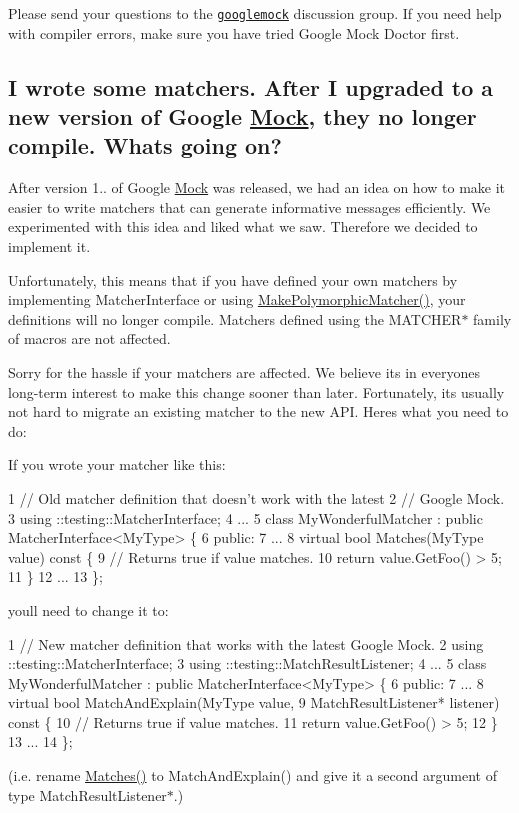 Please send your questions to the \href{http://groups.google.com/group/googlemock}{\tt googlemock} discussion group. If you need help with compiler errors, make sure you have tried Google Mock Doctor first.

\subsection*{I wrote some matchers. After I upgraded to a new version of Google \hyperlink{class_mock}{Mock}, they no longer compile. What\textquotesingle{}s going on?}

After version 1.. of Google \hyperlink{class_mock}{Mock} was released, we had an idea on how to make it easier to write matchers that can generate informative messages efficiently. We experimented with this idea and liked what we saw. Therefore we decided to implement it.

Unfortunately, this means that if you have defined your own matchers by implementing {\ttfamily Matcher\+Interface} or using {\ttfamily \hyperlink{namespacetesting_a667ca94f190ec2e17ee2fbfdb7d3da04}{Make\+Polymorphic\+Matcher()}}, your definitions will no longer compile. Matchers defined using the {\ttfamily M\+A\+T\+C\+H\+E\+R$\ast$} family of macros are not affected.

Sorry for the hassle if your matchers are affected. We believe it\textquotesingle{}s in everyone\textquotesingle{}s long-\/term interest to make this change sooner than later. Fortunately, it\textquotesingle{}s usually not hard to migrate an existing matcher to the new A\+PI. Here\textquotesingle{}s what you need to do\+:

If you wrote your matcher like this\+: 
\begin{DoxyCode}
1 // Old matcher definition that doesn't work with the latest
2 // Google Mock.
3 using ::testing::MatcherInterface;
4 ...
5 class MyWonderfulMatcher : public MatcherInterface<MyType> \{
6  public:
7   ...
8   virtual bool Matches(MyType value) const \{
9     // Returns true if value matches.
10     return value.GetFoo() > 5;
11   \}
12   ...
13 \};
\end{DoxyCode}


you\textquotesingle{}ll need to change it to\+: 
\begin{DoxyCode}
1 // New matcher definition that works with the latest Google Mock.
2 using ::testing::MatcherInterface;
3 using ::testing::MatchResultListener;
4 ...
5 class MyWonderfulMatcher : public MatcherInterface<MyType> \{
6  public:
7   ...
8   virtual bool MatchAndExplain(MyType value,
9                                MatchResultListener* listener) const \{
10     // Returns true if value matches.
11     return value.GetFoo() > 5;
12   \}
13   ...
14 \};
\end{DoxyCode}
 (i.\+e. rename {\ttfamily \hyperlink{namespacetesting_ad53b509ae9cd51040d67f668f99702ae}{Matches()}} to {\ttfamily Match\+And\+Explain()} and give it a second argument of type {\ttfamily Match\+Result\+Listener$\ast$}.)

